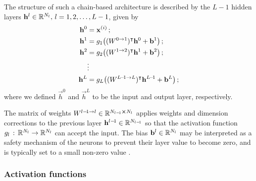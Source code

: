     The structure of such a chain-based architecture is described by the $L-1$ hidden layers $\vec{h}^l \in \RR[N_l],\,l=1,2, \dots, L-1$, given by
    \begin{subequations}\label{eq:nn_layers}
        \begin{align} 
            \vec{h}^0 &= \vec{x}^{(i)}\,; \\%
            \vec{h}^1 &= g_1 \big((W^{0\to 1})\TT \vec{h}^0 + \vec{b}^1\big)\,; \\
            \vec{h}^2 &= g_2 \big( (W^{1\to 2})\TT \vec{h}^1 + \vec{b}^2\big)\,; \\
            &\vdots \nonumber \\
            \vec{h}^{L} &= g_L \big((W^{{L\!-\!1\to L}})\TT \vec{h}^{L\!-\! 1} + \vec{b}^L\big)\,;             
        \end{align}
    \end{subequations}
    where we defined $\vec{h}^0$ and $\vec{h}^L$ to be the input and output layer, respectively. 

    The matrix of weights $W^{l-\! 1\to l} \in \RR[N_{l-\!1} \cross N_l]$ applies weights and dimension corrections to the previous layer $\vec{h}^{l-\! 1}\in \RR[N_{l-\! 1}]$ so that the activation function $g_l \,:\, \RR[N_l] \to \RR[N_l]$ can accept the input. The bias $\vec{b}^l \in \RR[N_l]$ may be interpreted as a safety mechanism of the neurons to prevent their layer value to become zero, and is typically set to a small non-zero value \citep{Goodfellow2016}. 

   



    \subsubsection{Activation functions}\label{sec:activation_function}

    



